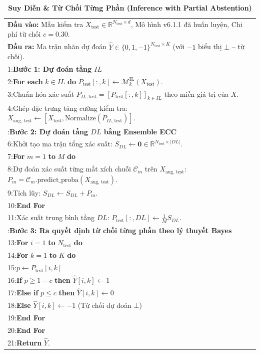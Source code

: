\documentclass[11pt,a4paper]{article}
\begin{document}
\begin{table}[H]
\centering
\small
\caption{\textbf{Suy Diễn \& Từ Chối Từng Phần (Inference with Partial Abstention)}}\label{alg:v611_inference}
\begin{tabular}{p{}}
\toprule
\textbf{Đầu vào:} Mẫu kiểm tra $X_{\text{test}} \in \mathbb{R}^{N_{\text{test}} \times d}$, Mô hình v6.1.1 đã huấn luyện, Chi phí từ chối $c = 0.30$. \\
\textbf{Đầu ra:} Ma trận nhãn dự đoán $\hat{Y} \in \{0, 1, -1\}^{N_{\text{test}} \times K}$ (với $-1$ biểu thị $\bot$ -- từ chối). \\
\midrule
1:\quad \textbf{Bước 1: Dự đoán tầng $IL$} \\
2:\quad \textbf{For each} $k \in IL$ \textbf{do} $P_{\text{test}}[:, k] \leftarrow \mathcal{M}_k^{\text{IL}}(X_{\text{test}})$. \\
3:\quad Chuẩn hóa xác suất $P_{IL, \text{test}} = [P_{\text{test}}[:, k]]_{k \in IL}$ theo miền giá trị của $X$. \\
4:\quad Ghép đặc trưng tăng cường kiểm tra: $X_{\text{aug, test}} \leftarrow [X_{\text{test}}, \text{Normalize}(P_{IL, \text{test}})]$. \\
\addlinespace
5:\quad \textbf{Bước 2: Dự đoán tầng $DL$ bằng Ensemble ECC} \\
6:\quad Khởi tạo ma trận tổng xác suất: $S_{DL} \leftarrow \mathbf{0} \in \mathbb{R}^{N_{\text{test}} \times |DL|}$. \\
7:\quad \textbf{For} $m = 1$ \textbf{to} $M$ \textbf{do} \\
8:\quad\quad Dự đoán xác suất từng mắt xích chuỗi $\mathcal{C}_m$ trên $X_{\text{aug, test}}$: $P_m = \mathcal{C}_m.\text{predict\_proba}(X_{\text{aug, test}})$. \\
9:\quad\quad Tích lũy: $S_{DL} \leftarrow S_{DL} + P_m$. \\
10:\quad \textbf{End For} \\
11:\quad Xác suất trung bình tầng $DL$: $P_{\text{test}}[:, DL] \leftarrow \frac{1}{M} S_{DL}$. \\
\addlinespace
12:\quad \textbf{Bước 3: Ra quyết định từ chối từng phần theo lý thuyết Bayes} \\
13:\quad \textbf{For} $i = 1$ \textbf{to} $N_{\text{test}}$ \textbf{do} \\
14:\quad\quad \textbf{For} $k = 1$ \textbf{to} $K$ \textbf{do} \\
15:\quad\quad\quad $p \leftarrow P_{\text{test}}[i, k]$ \\
16:\quad\quad\quad \textbf{If} $p \ge 1 - c$ \textbf{then} $\hat{Y}[i, k] \leftarrow 1$ \\
17:\quad\quad\quad \textbf{Else if} $p \le c$ \textbf{then} $\hat{Y}[i, k] \leftarrow 0$ \\
18:\quad\quad\quad \textbf{Else} $\hat{Y}[i, k] \leftarrow -1$ \quad (Từ chối dự đoán $\bot$) \\
19:\quad\quad \textbf{End For} \\
20:\quad \textbf{End For} \\
21:\quad \textbf{Return} $\hat{Y}$. \\
\bottomrule
\end{tabular}
\end{table}
\end{document}
